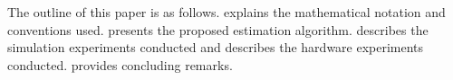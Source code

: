 
The outline of this paper is as follows.
 explains the mathematical notation and conventions
used.
 presents the proposed estimation algorithm.
 describes the simulation experiments conducted and
 describes the hardware experiments conducted.
 provides concluding remarks.
